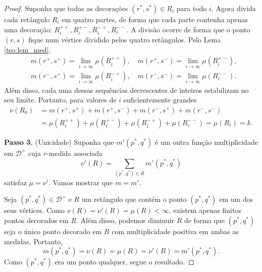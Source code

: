 \begin{proof}
Suponha que todas as decorações $(r^*, s^*) \in R_i$ para todo $i$. Agora divida cada retângulo
$R_i$ em quatro partes, de forma que cada parte contenha apenas uma decoração: $R_i^{++}, R_i^{+-},
R_i^{-+}, R_i^{--}$. A divisão ocorre de forma que o ponto $(r,s)$ fique num vértice dividido pelos 
quatro retângulos. Pelo Lema \ref{teo:lem_med},
\begin{align*} 
    & m(r^+, s^+) = \lim_{i \to \infty} \mu(R_i^{++}), \quad m(r^+, s^-) = \lim_{i \to \infty} \mu(R_i^{+-}), \\
    & m(r^-, s^+) = \lim_{i \to \infty} \mu(R_i^{-+}), \quad m(r^-, s^-) = \lim_{i \to \infty} \mu(R_i^{--}).
\end{align*}
Além disso, cada uma dessas sequências decrescentes de inteiros estabilizam no seu limite. Portanto, para valores
de $i$ suficientemente grandes
\begin{align*}
    \nu(R_0) & = m(r^+, s^+) + m(r^+, s^-) + m(r^-, s^+) + m(r^-, s^-) \\
             & = \mu(R_i^{++}) +  \mu(R_i^{+-}) + \mu(R_i^{-+}) + \mu(R_i^{--}) = \mu(R_i) = k. 
\end{align*}

\textbf{Passo 3.} (Unicidade) Suponha que $m'(p^*, q^*)$ é um outra função multiplicidade em $\mathcal{D}^\times$ 
cuja $r$-medida associada 
\begin{equation*}
    \nu'(R) = \sum_{(p^*, q^*) \in R} m'(p^*, q^*)
\end{equation*}
satisfaz $\mu = \nu'$. Vamos mostrar que $m=m'$. 

Seja $(p^*, q^*) \in \mathcal{D}^\times$ e $R$ um retângulo que contém o ponto $(p^*, q^*)$ em um
dos seus vértices. Como $\nu(R) = \nu'(R) = \mu(R) < \infty$, existem apenas finitos pontos decorados
em $R$. Além disso, podemos diminuir $R$ de forma que $(p^*, q^*)$ seja o único ponto decorado em $R$
com multiplicidade positiva em ambas as medidas. Portanto,
\begin{equation*}
    m(p^*, q^*) = \nu(R) = \mu(R) = \nu'(R) = m'(p^*, q^*).
\end{equation*} 
Como $(p^*, q^*)$ era um ponto qualquer, segue o resultado. 
\end{proof}

